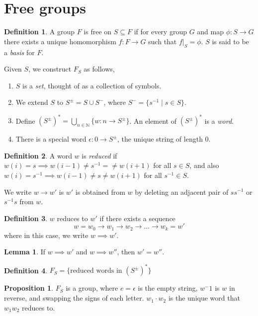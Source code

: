 \documentclass[a4paper,14pt]{extarticle}
\theoremstyle{definition}
\newtheorem*{definition}{Definition}
\newtheorem*{lemma}{Lemma}
\newtheorem*{proposition}{Proposition}
\begin{document}
\section{Free groups}
\begin{definition}
  A group $F$ is free on $S\subseteq F$ if for every group $G$ and map $\phi:S\rightarrow G$ there 
  exists a unique homomorphism $f:F\rightarrow G$ such that $f|_S=\phi$. $S$ is said 
  to be a \textit{basis} for $F$.
\end{definition}

  Given $S$, we construct $F_S$ as follows,
  \begin{enumerate}
    \item $S$ is a \textit{set}, thought of as a collection of symbols.
    \item We extend $S$ to $S^{\pm}=S\cup S^-$, where $S^-=\{s^{-1}\mid s\in S\}$. 
    \item Define $(S^{\pm})^*=\bigcup_{n\in\mathbb{N}}\{w:n\rightarrow S^{\pm}\}$.
    An element
    of $(S^{\pm})^*$ is a \textit{word}.
    \item There is a special word $\epsilon:0\rightarrow S^{\pm}$, the unique string of length 0.
  \end{enumerate}

\begin{definition}
  A word $w$ is \textit{reduced} if $w(i)=s\implies w(i-1)\neq s^{-1}=\neq w(i+1)$ for all $s\in S$, and also $w(i)=s^{-1}\implies w(i-1)\neq s\neq w(i+1)$ for all $s^{-1}\in S$.
\end{definition}

We write $w\rightarrow w'$ is $w'$ is obtained from $w$ by deleting an adjacent pair of $ss^{-1}$
or $s^{-1}s$ from $w$.

\begin{definition}
  $w$ reduces to $w'$ if there exists a sequence
  \[w=w_0\rightarrow w_1\rightarrow w_2\rightarrow\ldots\rightarrow w_k=w'\]
  where in this case, we write $w\implies w'$.
\end{definition}

\begin{lemma}
  If $w\implies w'$ and $w\implies w''$, then $w'=w''$.
\end{lemma}

\begin{definition}
  $F_S=\{\text{reduced words in }(S^\pm)^*\}$
\end{definition}

\begin{proposition}
  $F_S$ is a group, where $e=\epsilon$ is the empty string, $w^-1$ is $w$ in reverse, and swapping the signs of each letter. $w_1\cdot w_2$ is the unique word that $w_1w_2$ reduces 
  to.
\end{proposition}
\end{document}

